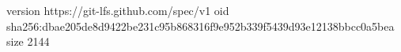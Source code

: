 version https://git-lfs.github.com/spec/v1
oid sha256:dbae205de8d9422be231c95b868316f9e952b339f5439d93e12138bbcc0a5bea
size 2144
